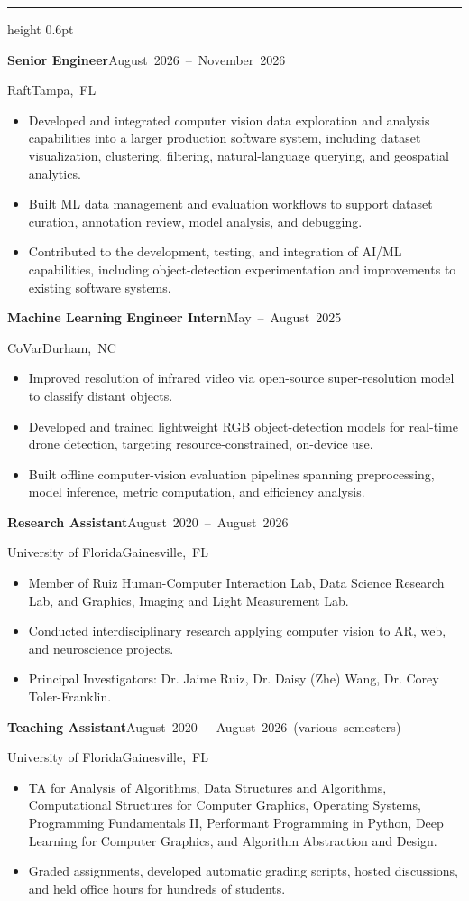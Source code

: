 \documentclass[11pt,letterpaper]{article}
\newcommand{\cvsection}[1]{\par\addvspace{11pt}\Needspace{5\baselineskip}{\fontsize{12}{14}\selectfont\textbf{\MakeUppercase{#1}}}\par\nobreak\vspace{2pt}\hrule height 0.6pt\nobreak\vspace{5pt}}
\newcommand{\cvrow}[2]{\noindent #1\hfill\mbox{#2}\par}
\newcommand{\cvrole}[4]{\par\addvspace{5pt}\Needspace{4\baselineskip}\cvrow{\textbf{#1}}{#2}\cvrow{#3}{#4}}
\begin{document}
\cvsection{Employment}
\cvrole{Senior Engineer}{August 2026 – November 2026}{Raft}{Tampa, FL}
\begin{itemize}
\item Developed and integrated computer vision data exploration and analysis capabilities into a larger production software system, including dataset visualization, clustering, filtering, natural-language querying, and geospatial analytics.
\item Built ML data management and evaluation workflows to support dataset curation, annotation review, model analysis, and debugging.
\item Contributed to the development, testing, and integration of AI/ML capabilities, including object-detection experimentation and improvements to existing software systems.
\end{itemize}
\cvrole{Machine Learning Engineer Intern}{May – August 2025}{CoVar}{Durham, NC}
\begin{itemize}
\item Improved resolution of infrared video via open-source super-resolution model to classify distant objects.
\item Developed and trained lightweight RGB object-detection models for real-time drone detection, targeting resource-constrained, on-device use.
\item Built offline computer-vision evaluation pipelines spanning preprocessing, model inference, metric computation, and efficiency analysis.
\end{itemize}
\cvrole{Research Assistant}{August 2020 – August 2026}{University of Florida}{Gainesville, FL}
\begin{itemize}
\item Member of Ruiz Human-Computer Interaction Lab, Data Science Research Lab, and Graphics, Imaging and Light Measurement Lab.
\item Conducted interdisciplinary research applying computer vision to AR, web, and neuroscience projects.
\item Principal Investigators: Dr. Jaime Ruiz, Dr. Daisy (Zhe) Wang, Dr. Corey Toler-Franklin.
\end{itemize}
\cvrole{Teaching Assistant}{August 2020 – August 2026 (various semesters)}{University of Florida}{Gainesville, FL}
\begin{itemize}
\item TA for Analysis of Algorithms, Data Structures and Algorithms, Computational Structures for Computer Graphics, Operating Systems, Programming Fundamentals II, Performant Programming in Python, Deep Learning for Computer Graphics, and Algorithm Abstraction and Design.
\item Graded assignments, developed automatic grading scripts, hosted discussions, and held office hours for hundreds of students.
\end{itemize}
\end{document}
